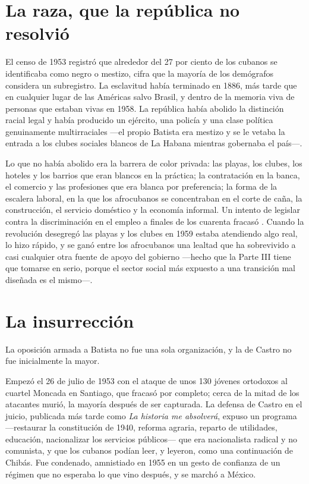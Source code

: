 \section{La raza, que la república no resolvió}

El censo de 1953 registró que alrededor del 27 por ciento de los cubanos se
identificaba como negro o mestizo, cifra que la mayoría de los demógrafos
considera un subregistro.\unv{} La esclavitud había terminado en 1886, más tarde
que en cualquier lugar de las Américas salvo Brasil, y dentro de la memoria viva
de personas que estaban vivas en 1958. La república había abolido la distinción
racial legal y había producido un ejército, una policía y una clase política
genuinamente multirraciales ---el propio Batista era mestizo y se le vetaba la
entrada a los clubes sociales blancos de La Habana mientras gobernaba el país---.

Lo que no había abolido era la barrera de color privada: las playas, los clubes,
los hoteles y los barrios que eran blancos en la práctica; la contratación en la
banca, el comercio y las profesiones que era blanca por preferencia; la forma de
la escalera laboral, en la que los afrocubanos se concentraban en el corte de
caña, la construcción, el servicio doméstico y la economía informal. Un intento
de legislar contra la discriminación en el empleo a finales de los cuarenta
fracasó \citep{delafuente2001}. Cuando la revolución desegregó las playas y los
clubes en 1959 estaba atendiendo algo real, lo hizo rápido, y se ganó entre los
afrocubanos una lealtad que ha sobrevivido a casi cualquier otra fuente de apoyo
del gobierno ---hecho que la Parte III tiene que tomarse en serio, porque el
sector social más expuesto a una transición mal diseñada es el mismo---.

\section{La insurrección}

La oposición armada a Batista no fue una sola organización, y la de Castro no fue
inicialmente la mayor.

Empezó el 26 de julio de 1953 con el ataque de unos 130 jóvenes ortodoxos al
cuartel Moncada en Santiago, que fracasó por completo; cerca de la mitad de los
atacantes murió, la mayoría después de ser capturada. La defensa de Castro en el
juicio, publicada más tarde como \emph{La historia me absolverá}, expuso un
programa ---restaurar la constitución de 1940, reforma agraria, reparto de
utilidades, educación, nacionalizar los servicios públicos--- que era
nacionalista radical y no comunista, y que los cubanos podían leer, y leyeron,
como una continuación de Chibás. Fue condenado, amnistiado en 1955 en un gesto de
confianza de un régimen que no esperaba lo que vino después, y se marchó a
México.

